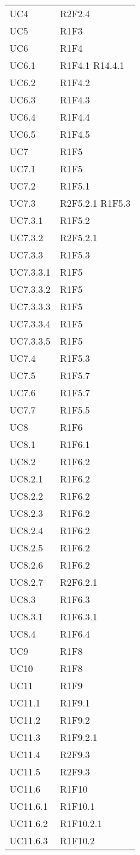 {\begin{longtable}{C{4cm} C{11.5cm}}
UC4 & R2F2.4 \\

UC5 & R1F3 \\

UC6 & R1F4 \\
UC6.1 & R1F4.1 \quad R14.4.1\\
UC6.2 & R1F4.2 \\
UC6.3 & R1F4.3 \\
UC6.4 & R1F4.4 \\
UC6.5 & R1F4.5 \\

UC7 & R1F5 \\
UC7.1 & R1F5 \\
UC7.2 & R1F5.1 \\
UC7.3 & R2F5.2.1  \quad R1F5.3\\
UC7.3.1 & R1F5.2 \\
UC7.3.2 & R2F5.2.1 \\
UC7.3.3 & R1F5.3 \\
UC7.3.3.1 & R1F5 \\
UC7.3.3.2 & R1F5 \\
UC7.3.3.3 & R1F5 \\
UC7.3.3.4 & R1F5 \\
UC7.3.3.5 & R1F5 \\
UC7.4 & R1F5.3 \\
UC7.5 & R1F5.7 \\
UC7.6 & R1F5.7 \\
UC7.7 & R1F5.5 \\

UC8 & R1F6 \\
UC8.1 & R1F6.1 \\
UC8.2 & R1F6.2 \\
UC8.2.1 & R1F6.2 \\
UC8.2.2 & R1F6.2 \\
UC8.2.3 & R1F6.2 \\
UC8.2.4 & R1F6.2 \\
UC8.2.5 & R1F6.2 \\
UC8.2.6 & R1F6.2 \\
UC8.2.7 & R2F6.2.1 \\
UC8.3 & R1F6.3 \\
UC8.3.1 & R1F6.3.1 \\
UC8.4 & R1F6.4 \\

UC9 & R1F8 \\

UC10 & R1F8 \\

UC11 & R1F9 \\
UC11.1 & R1F9.1 \\
UC11.2 & R1F9.2 \\
UC11.3 & R1F9.2.1 \\
UC11.4 & R2F9.3 \\
UC11.5 & R2F9.3 \\
UC11.6 & R1F10 \\
UC11.6.1 & R1F10.1 \\
UC11.6.2 & R1F10.2.1 \\
UC11.6.3 & R1F10.2 \\


\end{longtable}}
